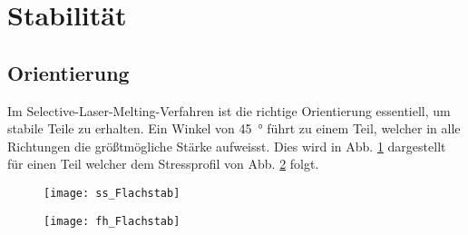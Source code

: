 \documentclass[../main.tex]{subfiles}
\begin{document}
\section{Stabilität}
\subsection{Orientierung}
Im Selective-Laser-Melting-Verfahren ist die richtige Orientierung essentiell, um stabile Teile zu erhalten.
Ein Winkel von \qty{45}{\degree} führt zu einem Teil, welcher in alle Richtungen die größtmögliche Stärke aufweisst. Dies wird in Abb. \ref{img:ss_1} dargestellt für einen Teil welcher dem Stressprofil von Abb. \ref{img:fh_1} folgt.

\begin{figure}[h]
	\centering
	\texttt{[image: ss\_Flachstab]}
	\label{img:ss_1}
\end{figure}
\begin{figure}[h]
	\centering
	\texttt{[image: fh\_Flachstab]}
	\label{img:fh_1}
\end{figure}
\end{document}
